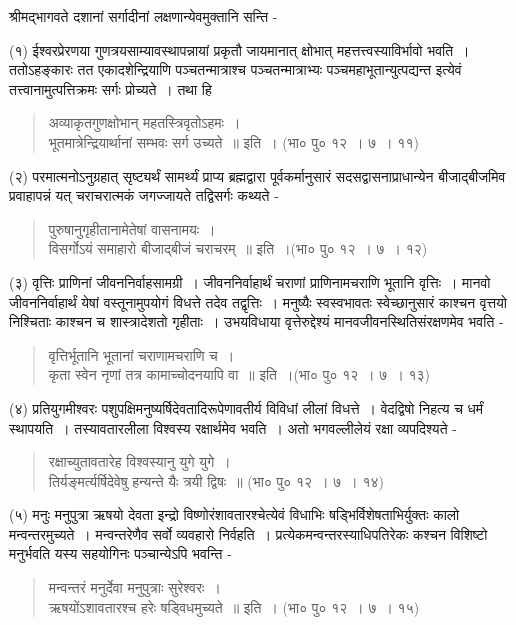 {श्रीमद्भागवते दशानां सर्गादीनां लक्षणान्येवमुक्तानि सन्ति -

(१) ईश्वरप्रेरणया गुणत्रयसाम्यावस्थापन्नायां प्रकृतौ जायमानात् क्षोभात् महत्तत्त्वस्या\-विर्भावो भवति~। ततोऽहङ्कारः तत एकादशेन्द्रियाणि पञ्चतन्मात्राश्च पञ्चतन्मात्राभ्यः पञ्चमहाभूतान्युत्पद्यन्त इत्येवं तत्त्वानामुत्पत्तिक्रमः सर्गः प्रोच्यते~। तथा हि \enginline{-}
\begin{verse}
अव्याकृतगुणक्षोभान् महतस्त्रिवृतोऽहमः~। \\
भूतमात्रेन्द्रियार्थानां सम्भवः सर्ग उच्यते~॥ इति~। (भा० पु० १२~। ७~। ११)
\end{verse}
(२) परमात्मनोऽनुग्रहात् सृष्ट्यर्थं सामर्थ्यं प्राप्य ब्रह्मद्वारा पूर्वकर्मानुसारं सदसद्वासना\-प्राधान्येन बीजाद्बीजमिव प्रवाहापन्नं यत् चराचरात्मकं जगज्जायते तद्विसर्गः कथ्यते -
\begin{verse}
पुरुषानुगृहीतानामेतेषां वासनामयः~। \\
विसर्गोऽयं समाहारो बीजाद्बीजं चराचरम्~॥ इति~।(भा० पु० १२~। ७~। १२)
\end{verse}
(३) वृत्तिः प्राणिनां जीवननिर्वाहसामग्री~। जीवननिर्वाहार्थं चराणां प्राणिनामचराणि भूतानि वृत्तिः~। मानवो जीवननिर्वाहार्थं येषां वस्तूनामुपयोगं विधत्ते तदेव तद्वृत्तिः~। मनुष्यैः स्वस्वभावतः स्वेच्छानुसारं काश्चन वृत्तयो निश्चिताः काश्चन च शास्त्रादेशतो गृहीताः~। उभयविधाया वृत्तेरुद्देश्यं मानवजीवनस्थितिसंरक्षणमेव भवति -
\begin{verse}
वृत्तिर्भूतानि भूतानां चराणामचराणि च~। \\
कृता स्वेन नृणां तत्र कामाच्चोदनयापि वा~॥ इति~।(भा० पु० १२~। ७~। १३)
\end{verse}
(४) प्रतियुगमीश्वरः पशुपक्षिमनुष्यर्षिदेवतादिरूपेणावतीर्य विविधां लीलां विधत्ते~। वेदद्विषो निहत्य च धर्मं स्थापयति~। तस्यावतारलीला विश्वस्य रक्षार्थमेव भवति~। अतो भगवल्लीलेयं रक्षा व्यपदिश्यते -
\begin{verse}
रक्षाच्युतावतारेह विश्वस्यानु युगे युगे~। \\
तिर्यङ्मर्त्यर्षिदेवेषु हन्यन्ते यैः त्रयी द्विषः~॥ (भा० पु० १२~। ७~। १४)
\end{verse}
(५) मनुः मनुपुत्रा ऋषयो देवता इन्द्रो विष्णोरंशावतारश्चेत्येवं विधाभिः षड्भिर्विशेषता\-भिर्युक्तः कालो मन्वन्तरमुच्यते~। मन्वन्तरेणैव सर्वो व्यवहारो निर्वहति~। प्रत्येकमन्वन्तरस्या\-धिपतिरेकः कश्चन विशिष्टो मनुर्भवति यस्य सहयोगिनः पञ्चान्येऽपि भवन्ति -
\begin{verse}
मन्वन्तरं मनुर्देवा मनुपुत्राः सुरेश्वरः~। \\
ऋषयोंऽशावतारश्च हरेः षड्विधमुच्यते~॥ इति~। (भा० पु० १२~। ७~। १५)
\end{verse}
}
